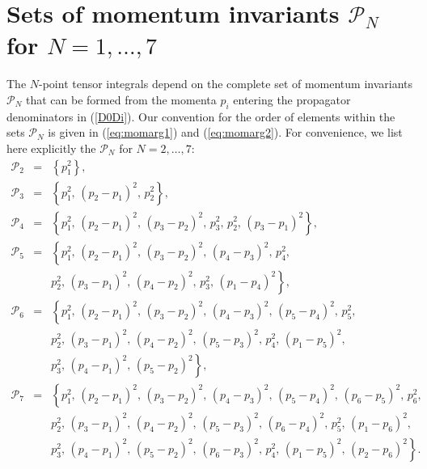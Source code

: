 \documentclass[preprint,sort&compress,12pt]{elsarticle}
\def\refeq#1{\mbox{(\ref{#1})}}
\begin{document}
\section{Sets of momentum invariants $\mathcal{P}_N$ for $N=1,\ldots,7$}
\label{App:MomInv}
The $N$-point tensor integrals depend on the complete set of momentum
invariants $\mathcal{P}_N$ that can be formed
from the momenta $p_i$ entering the propagator denominators in
\refeq{D0Di}. Our convention for the order of elements within the sets
$\mathcal{P}_N$ is
given in \refeq{eq:momarg1} and \refeq{eq:momarg2}. For convenience, we list here
explicitly the $\mathcal{P}_N$ for $N=2,\ldots,7$:
\begin{eqnarray}
  \mathcal{P}_{2}\!\!\!&=&\!\!\!\left\{p_1^2\right\}\!,\nonumber\\[1.5ex]
  \mathcal{P}_{3}\!\!\!&=&\!\!\!\left\{p_1^2,\,(p_2-p_1)^2,\,p_2^2\right\}\!,\nonumber\\[1.5ex]
  \mathcal{P}_{4}\!\!\!&=&\!\!\!\left\{p_1^2,\,(p_2-p_1)^2,\,(p_3-p_2)^2,\,p_3^2,\,p_2^2,\,(p_3-p_1)^2\right\}\!,\nonumber\\[1.5ex]
  \mathcal{P}_{5}\!\!\!&=&\!\!\!\left\{p_1^2,\,(p_2-p_1)^2,\,(p_3-p_2)^2,\,(p_4-p_3)^2,\,p_4^2,\right.\nonumber\\
                       && \left.p_2^2,\,(p_3-p_1)^2,\,(p_4-p_2)^2,\,p_3^2,\,(p_1-p_4)^2\right\}\!,\nonumber\\[1.5ex]
  \mathcal{P}_{6}\!\!\!&=&\!\!\!\left\{p_1^2,\,(p_2-p_1)^2,\,(p_3-p_2)^2,\,(p_4-p_3)^2,\,(p_5-p_4)^2,\,p_5^2,\right.\nonumber\\
                       && \left.p_2^2,\,(p_3-p_1)^2,\,(p_4-p_2)^2,\,(p_5-p_3)^2,\,p_4^2,\,(p_1-p_5)^2,\right.\nonumber\\
                       && \left.p_3^2,\,(p_4-p_1)^2,\,(p_5-p_2)^2\right\}\!,\nonumber\\[1.5ex]
  \mathcal{P}_{7}\!\!\!&=&\!\!\!\left\{p_1^2,\,(p_2-p_1)^2,\,(p_3-p_2)^2,\,(p_4-p_3)^2,\,(p_5-p_4)^2,\,(p_6-p_5)^2,\,p_6^2,\right.\nonumber\\
                       && \left.p_2^2,\,(p_3-p_1)^2,\,(p_4-p_2)^2,\,(p_5-p_3)^2,\,(p_6-p_4)^2,\,p_5^2,\,(p_1-p_6)^2,\right.\nonumber\\
                       && \left.p_3^2,\,(p_4-p_1)^2,\,(p_5-p_2)^2,\,(p_6-p_3)^2,\,p_4^2,\,(p_1-p_5)^2,\,(p_2-p_6)^2\right\}\!.\hspace{1cm}%
\end{eqnarray}
\end{document}
